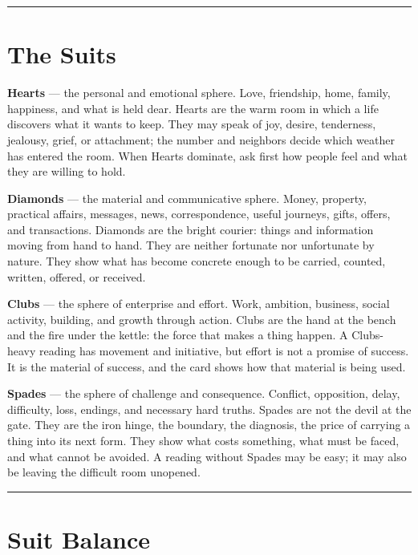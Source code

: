 \begin{center}\rule{0.5\linewidth}{0.5pt}\end{center}

\section{The Suits}\label{the-suits}

\textbf{Hearts} --- the personal and emotional sphere. Love, friendship, home,
family, happiness, and what is held dear. Hearts are the warm room in which a
life discovers what it wants to keep. They may speak of joy, desire, tenderness,
jealousy, grief, or attachment; the number and neighbors decide which weather
has entered the room. When Hearts dominate, ask first how people feel and what
they are willing to hold.

\textbf{Diamonds} --- the material and communicative sphere. Money, property,
practical affairs, messages, news, correspondence, useful journeys, gifts,
offers, and transactions. Diamonds are the bright courier: things and
information moving from hand to hand. They are neither fortunate nor unfortunate
by nature. They show what has become concrete enough to be carried, counted,
written, offered, or received.

\textbf{Clubs} --- the sphere of enterprise and effort. Work, ambition, business,
social activity, building, and growth through action. Clubs are the hand at the
bench and the fire under the kettle: the force that makes a thing happen. A
Clubs-heavy reading has movement and initiative, but effort is not a promise of
success. It is the material of success, and the card shows how that material is
being used.

\textbf{Spades} --- the sphere of challenge and consequence. Conflict, opposition,
delay, difficulty, loss, endings, and necessary hard truths. Spades are not the
devil at the gate. They are the iron hinge, the boundary, the diagnosis, the
price of carrying a thing into its next form. They show what costs something,
what must be faced, and what cannot be avoided. A reading without Spades may be
easy; it may also be leaving the difficult room unopened.

\begin{center}\rule{0.5\linewidth}{0.5pt}\end{center}

\section{Suit Balance}\label{suit-balance}

